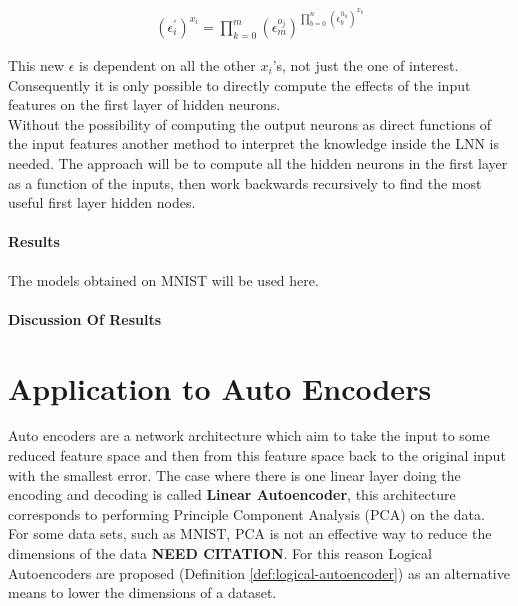 \begin{align*}
	(\epsilon^{'}_i)^{x_i} = \prod_{k = 0}^{m} (\epsilon^{o_j}_m)^{\prod_{b = 0}^{n} (\epsilon^{h_k}_b)^{x_b}}
\end{align*}

This new $\epsilon$ is dependent on all the other $x_i$'s, not just the one of interest. Consequently it is only possible to directly compute the effects of the input features on the first layer of hidden neurons.\\

Without the possibility of computing the output neurons as direct functions of the input features another method to interpret the knowledge inside the LNN is needed. The approach will be to compute all the hidden neurons in the first layer as a function of the inputs, then work backwards recursively to find the most useful first layer hidden nodes.

\subsubsection{Results}
The models obtained on MNIST will be used here.


\subsubsection{Discussion Of Results}


\chapter{Application to Auto Encoders} \label{C:lnn-application}
Auto encoders \cite{baldi2012complex} are a network architecture which aim to take the input to some reduced feature space and then from this feature space back to the original input with the smallest error. The case where there is one linear layer doing the encoding and decoding is called \textbf{Linear Autoencoder}, this architecture corresponds to performing Principle Component Analysis (PCA) on the data.\\

For some data sets, such as MNIST, PCA is not an effective way to reduce the dimensions of the data \textbf{NEED CITATION}. For this reason Logical Autoencoders are proposed (Definition \ref{def:logical-autoencoder}) as an alternative means to lower the dimensions of a dataset.

